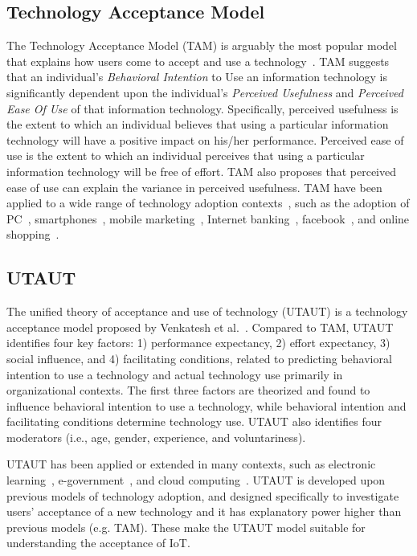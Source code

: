 \subsection{Technology Acceptance Model}
The Technology Acceptance Model (TAM) is arguably the most popular model that explains how users come to accept and use a technology~\cite{davis1989user}. TAM suggests that an individual's \textit{Behavioral Intention} to Use an information technology is significantly dependent upon the individual's \textit{Perceived Usefulness} and \textit{Perceived Ease Of Use} of that information technology. Specifically, perceived usefulness is the extent to which an individual believes that using a particular information technology will have a positive impact on his/her performance. Perceived ease of use is the extent to which an individual perceives that using a particular information technology will be free of effort. TAM also proposes that perceived ease of use can explain the variance in perceived usefulness.
TAM have been applied to a wide range of technology adoption contexts~\cite{wixom2005theoretical}, such as the adoption of PC~\cite{venkatesh2001longitudinal}, smartphones~\cite{park2007acceptance}, mobile marketing~\cite{bauer2005driving}, Internet banking~\cite{pikkarainen2004consumer}, facebook~\cite{lee2012effect, rauniar2014technology}, and online shopping~\cite{gefen2003trust}.

\subsection{UTAUT}
The unified theory of acceptance and use of technology (UTAUT) is a technology acceptance model proposed by Venkatesh et al.~\cite{venkatesh2003user}. Compared to TAM, UTAUT identifies four key factors: 1) performance expectancy, 2) effort expectancy, 3) social influence, and 4) facilitating conditions, related to predicting behavioral intention to use a technology and actual technology use primarily in organizational contexts. The first three factors are theorized and found to influence behavioral intention to use a technology, while behavioral intention and facilitating conditions determine technology use. UTAUT also identifies four moderators (i.e., age, gender, experience, and voluntariness).

UTAUT has been applied or extended in many contexts, such as electronic learning~\cite{wang2009interactive}, e-government~\cite{weerakkody2013examining}, and cloud computing~\cite{lian2015critical}. UTAUT is developed upon previous models of technology adoption, and designed specifically to investigate users’ acceptance of a new technology and it has explanatory power higher than previous models (e.g. TAM). These make the UTAUT model suitable for understanding the acceptance of IoT.

